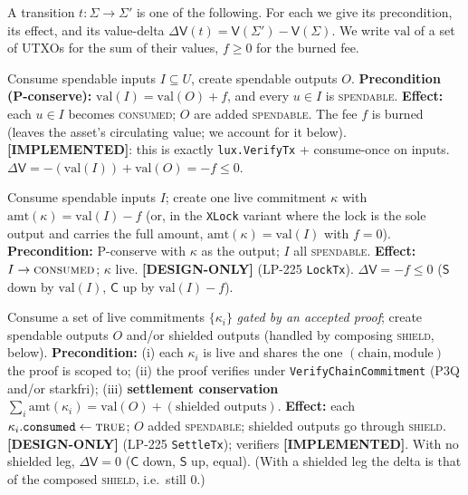 \documentclass[11pt]{article}
\theoremstyle{definition}
\theoremstyle{remark}
\newcommand{\IMPL}{\textbf{[IMPLEMENTED]}}
\newcommand{\DESIGN}{\textbf{[DESIGN-ONLY]}}
\newcommand{\Val}{\mathsf{V}}
\newcommand{\spend}{\mathsf{S}}
\newcommand{\commit}{\mathsf{C}}
\begin{document}
A transition $t:\Sigma\to\Sigma'$ is one of the following. For each we
give its precondition, its effect, and its value-delta
$\Delta\Val(t)=\Val(\Sigma')-\Val(\Sigma)$. We write $\mathrm{val}$ of a
set of UTXOs for the sum of their values, $f\ge 0$ for the burned fee.

\begin{description}[leftmargin=1.5em,style=nextline]

\item[\textsc{spend}] Consume spendable inputs $I\subseteq U$, create
  spendable outputs $O$. \textbf{Precondition (P-conserve):}
  $\mathrm{val}(I) = \mathrm{val}(O) + f$, and every $u\in I$ is
  \textsc{spendable}. \textbf{Effect:} each $u\in I$ becomes
  \textsc{consumed}; $O$ are added \textsc{spendable}. The fee $f$ is
  burned (leaves the asset's circulating value; we account for it
  below). \IMPL{}: this is exactly \texttt{lux.VerifyTx} +
  consume-once on inputs. $\Delta\Val = -(\mathrm{val}(I)) +
  \mathrm{val}(O) = -f \le 0$.

\item[\textsc{lock}] Consume spendable inputs $I$; create one live
  commitment $\kappa$ with $\mathrm{amt}(\kappa)=\mathrm{val}(I)-f$ (or,
  in the \texttt{XLock} variant where the lock is the sole output and
  carries the full amount, $\mathrm{amt}(\kappa)=\mathrm{val}(I)$ with
  $f=0$). \textbf{Precondition:} P-conserve with $\kappa$ as the output;
  $I$ all \textsc{spendable}. \textbf{Effect:} $I\to\textsc{consumed}$;
  $\kappa$ live. \DESIGN{} (LP-225 \texttt{LockTx}). $\Delta\Val=-f\le0$
  ($\spend$ down by $\mathrm{val}(I)$, $\commit$ up by
  $\mathrm{val}(I)-f$).

\item[\textsc{settle}] Consume a set of live commitments
  $\{\kappa_i\}$ \emph{gated by an accepted proof}; create spendable
  outputs $O$ and/or shielded outputs (handled by composing
  \textsc{shield}, below). \textbf{Precondition:} (i) each $\kappa_i$ is
  live and shares the one $(\mathrm{chain},\mathrm{module})$ the proof is
  scoped to; (ii) the proof verifies under \texttt{VerifyChainCommitment}
  (P3Q and/or starkfri); (iii) \textbf{settlement conservation}
  $\sum_i\mathrm{amt}(\kappa_i) = \mathrm{val}(O) +
  (\text{shielded outputs})$. \textbf{Effect:} each $\kappa_i.\texttt{consumed}
  \gets\textsc{true}$; $O$ added \textsc{spendable}; shielded outputs go
  through \textsc{shield}. \DESIGN{} (LP-225 \texttt{SettleTx}); verifiers
  \IMPL{}. With no shielded leg, $\Delta\Val = 0$ ($\commit$ down,
  $\spend$ up, equal). (With a shielded leg the delta is that of the
  composed \textsc{shield}, i.e.\ still $0$.)


\end{description}
\end{document}
